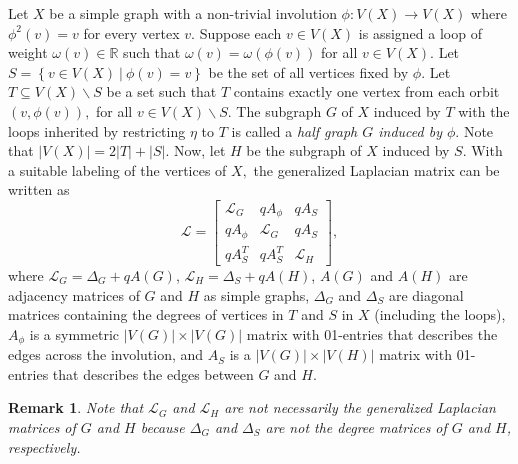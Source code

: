 \documentclass[12pt,a4paper]{article}
\newtheorem{rem}{Remark}
\newcommand{\cb}[1]{\left\lbrace #1\right\rbrace}
\begin{document}
Let $X$ be a simple graph with a non-trivial involution $\phi: V(X) \to V(X)$ where $\phi^2(v)=v$ for every vertex $v.$ Suppose each $v\in V(X)$ is assigned a loop of weight $\omega(v)\in\mathbb{R}$ such that $\omega(v) = \omega(\phi(v))$ for all $v \in V(X).$ Let $S=\cb{v \in V(X) ~|~ \phi(v)=v}$ be the set of all vertices fixed by $\phi$. Let $T\subseteq V(X)\backslash S$ be a set such that $T$ contains exactly one vertex from each orbit $(v, \phi(v)),$ for all $v \in V(X)\backslash S.$ The subgraph $G$ of $X$ induced by $T$ with the loops inherited by restricting $\eta$ to $T$ is called a \textit{half graph $G$ induced by $\phi$}. Note that $|V(X)|=2|T|+|S|$. Now, let $H$ be the subgraph of $X$ induced by $S$. With a suitable labeling of the vertices of $X,$ the generalized Laplacian matrix can be written as
\[\mathscr{L}=
\begin{bmatrix}
	\mathscr{L}_G& qA_\phi& qA_S\\
	qA_\phi &\mathscr{L}_G & qA_S\\
	qA_S^T & qA_S^T & \mathscr{L}_H
\end{bmatrix},\]
where 
$\mathscr{L}_G=\Delta_{G}+qA(G)$, $\mathscr{L}_H=\Delta_{S}+qA(H)$, $A(G)$ and $A(H)$ are adjacency matrices of $G$ and $H$ as simple graphs, $\Delta_{G}$ and $\Delta_{S}$ are diagonal matrices containing the degrees of vertices in $T$ and $S$ in $X$ (including the loops), $A_\phi$ is a symmetric $|V(G)|\times |V(G)|$ matrix with 01-entries that describes the edges across the involution, and $A_S$ is a $|V(G)|\times |V(H)|$ matrix with 01-entries that describes the edges between $G$ and $H$.

\begin{rem}
Note that $\mathscr{L}_G$ and $\mathscr{L}_H$ are not necessarily the generalized Laplacian matrices of $G$ and $H$ because $\Delta_{G}$ and $\Delta_S$ are not the degree matrices of $G$ and $H$, respectively.
\end{rem}
\end{document}
